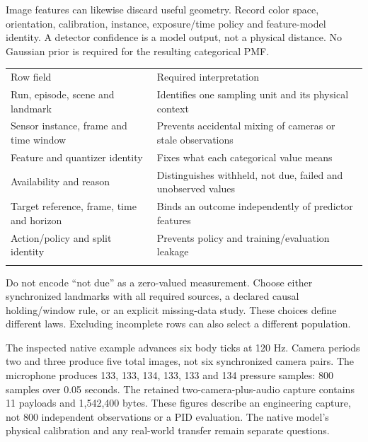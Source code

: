 \documentclass[11pt,a4paper]{article}
\newcounter{none}
\begin{document}
Image features can likewise discard useful geometry. Record color space, orientation, calibration, instance, exposure/time policy and feature-model identity. A detector confidence is a model output, not a physical distance. No Gaussian prior is required for the resulting categorical PMF.

{\def\LTcaptype{none} %
\begin{longtable}[]{@{}
  >{\raggedright\arraybackslash}p{}
  >{\raggedright\arraybackslash}p{}@{}}
\toprule\noalign{}
\begin{minipage}[b]{\linewidth}\raggedright
Row field
\end{minipage} & \begin{minipage}[b]{\linewidth}\raggedright
Required interpretation
\end{minipage} \\*
\midrule\noalign{}
\endhead
\bottomrule\noalign{}
\endfoot
Run, episode, scene and landmark & Identifies one sampling unit and its physical context \\*
Sensor instance, frame and time window & Prevents accidental mixing of cameras or stale observations \\*
Feature and quantizer identity & Fixes what each categorical value means \\*
Availability and reason & Distinguishes withheld, not due, failed and unobserved values \\*
Target reference, frame, time and horizon & Binds an outcome independently of predictor features \\*
Action/policy and split identity & Prevents policy and training/evaluation leakage \\*
\end{longtable}
}

Do not encode ``not due'' as a zero-valued measurement. Choose either synchronized landmarks with all required sources, a declared causal holding/window rule, or an explicit missing-data study. These choices define different laws. Excluding incomplete rows can also select a different population.

The inspected native example advances six body ticks at 120 Hz. Camera periods two and three produce five total images, not six synchronized camera pairs. The microphone produces 133, 133, 134, 133, 133 and 134 pressure samples: 800 samples over 0.05 seconds. The retained two-camera-plus-audio capture contains 11 payloads and 1,542,400 bytes. These figures describe an engineering capture, not 800 independent observations or a PID evaluation. The native model's physical calibration and any real-world transfer remain separate questions.
\end{document}
